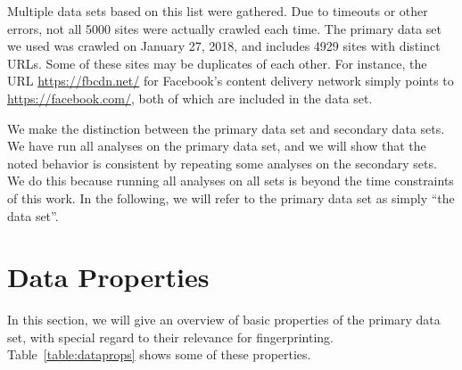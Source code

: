 \documentclass[
    fontsize=12pt,
    headings=small,
    parskip=half,
    bibliography=totoc,
    numbers=noenddot,
    open=any
    ]{scrreprt}
\begin{document}
Multiple data sets based on this list were gathered. Due to timeouts or other
errors, not all 5000 sites were actually crawled each time.
The primary data set we used was crawled on January 27, 2018, and includes 4929 sites with distinct URLs. Some of these sites
may be duplicates of each other. For instance, the URL \url{https://fbcdn.net/} for Facebook's content delivery
network simply points to \url{https://facebook.com/}, both of which are included in the data set.

We make the distinction between the primary data set and secondary data sets.
We have run all analyses on the primary data set, and we will show
that the noted behavior is consistent by repeating some analyses
on the secondary sets.
We do this because running all analyses on all sets is beyond the time
constraints of this work.
In the following, we will refer to the primary data set as simply ``the data set''.

\section{Data Properties}
\label{section:data_properties}
In this section, we will give an overview of basic properties of the primary data set,
with special regard to their relevance for fingerprinting.
Table~\ref{table:dataprops} shows some of these properties.
\end{document}
